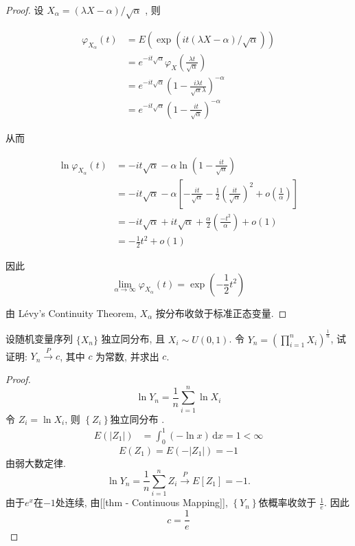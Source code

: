 \documentclass[../main.tex]{subfiles}
\begin{document}
\begin{proof}
设 $X_{\alpha }= \left(\lambda X-\alpha \right)/\sqrt{\alpha }$ , 则

$$
\begin{aligned} \varphi _{X_{\alpha }}(t) &= E\left(\exp \left(it\left(\lambda X-\alpha \right)/\sqrt{\alpha }\right)\right)\\&= e^{-it\sqrt{\alpha }}\varphi _{X}\left(\frac{\lambda t }{\sqrt{\alpha } }\right)\\&= e^{-it\sqrt{\alpha }}\left(1-\frac{ i\lambda t }{\sqrt{\alpha }\lambda  }\right)^{-\alpha }\\&= e^{-it\sqrt{\alpha }}\left(1-\frac{i t}{\sqrt{\alpha } }\right)^{-\alpha } \end{aligned}
$$

从而

$$
\begin{aligned} \ln \varphi _{X_{\alpha }}\left(t\right)&= -it\sqrt{\alpha }-\alpha \ln \left(1-\frac{it }{\sqrt{\alpha } }\right)\\&= -it\sqrt{\alpha }-\alpha \left[ -\frac{it }{\sqrt{\alpha } } - \frac{1}{2}\left(\frac{it}{\sqrt{\alpha}}\right)^2 + o\left(\frac{1}{\alpha}\right) \right] \\&= -it\sqrt{\alpha } + it\sqrt{\alpha } + \frac{\alpha}{2}\left(\frac{-t^2}{\alpha}\right) + o(1) \\&= -\frac{1}{2}t^{2}+ o(1) \end{aligned}
$$

因此
$$
\lim_{\alpha \to \infty}\varphi _{X_{\alpha }}\left(t\right)= \exp \left(-\frac{1}{2}t^{2}\right)
$$

由 Lévy's Continuity Theorem, $X_{\alpha }$ 按分布收敛于标准正态变量.
\end{proof}
\begin{exercise}{}{}
设随机变量序列 $\{X_n\}$ 独立同分布, 且 $X_i \sim U(0,1)$. 令 $Y_n = \left( \prod_{i=1}^n X_i \right)^{\frac{1}{n}}$, 试证明: $Y_n \xrightarrow{P} c$, 其中 $c$ 为常数, 并求出 $c$.
\end{exercise}
\begin{proof}
 $$ \ln Y_{n}= \frac{1}{n}\sum _{i= 1}^{n}\ln X_{i} $$  
令 $Z_{i}= \ln X_{i}$, 则 $\left\{ Z_{i} \right\}$独立同分布 .   
 $$ \begin{aligned} E\left(\left| Z_1 \right| \right)&= \int_{0}^{1}\left(-\ln x\right)\,\mathrm{d} x= 1 < \infty\end{aligned} $$  
$$ E\left(Z_1\right)= E\left(-\left| Z_1 \right| \right)= -1 $$
  由弱大数定律. 
$$\ln Y_n = \frac{1}{n} \sum_{i=1}^n Z_i \xrightarrow{P} E[Z_1] = -1.$$
 由于$e^{x}$在$-1$处连续, 由[[thm - Continuous Mapping]],  $\left\{ Y_{n} \right\}$依概率收敛于 $\frac{1 }{e }$. 因此 
 $$ c= \frac{1 }{e } $$ 
\end{proof}
\end{document}

